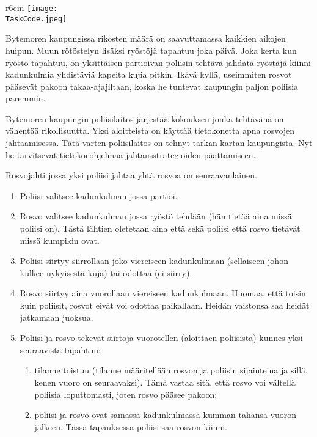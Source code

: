 \documentclass{boi2014-fi}
\renewcommand{\TaskCode}{coprobber}
\begin{document}
    \begin{wrapfigure}[8]{r}{6cm}
        \vspace{-24pt}
		\texttt{[image: \\TaskCode.jpeg]}
	\end{wrapfigure}
    
    Bytemoren kaupungissa rikosten määrä on saavuttamassa kaikkien aikojen
    huipun. Muun rötöstelyn lisäksi ryöstöjä tapahtuu joka päivä.
    Joka kerta kun ryöstö tapahtuu, on yksittäisen partioivan poliisin
    tehtävä jahdata ryöstäjä kiinni kadunkulmia yhdistäviä kapeita kujia
    pitkin. Ikävä kyllä, useimmiten rosvot pääsevät pakoon takaa-ajajiltaan,
    koska he tuntevat kaupungin paljon poliisia paremmin.

    Bytemoren kaupungin poliisilaitos järjestää kokouksen jonka tehtävänä
    on vähentää rikollisuutta. Yksi aloitteista on käyttää tietokonetta
    apna rosvojen jahtaamisessa. Tätä varten poliisilaitos on tehnyt tarkan
    kartan kaupungista. Nyt he tarvitsevat tietokoeohjelmaa
    jahtausstrategioiden päättämiseen.
    
    Rosvojahti jossa yksi poliisi jahtaa yhtä rosvoa on seuraavanlainen.
    \begin{enumerate}
        \item Poliisi valitsee kadunkulman jossa partioi.
        \item Rosvo valitsee kadunkulman jossa ryöstö tehdään (hän tietää
            aina missä poliisi on). Tästä lähtien oletetaan aina että sekä
            poliisi että rosvo tietävät missä kumpikin ovat.
        \item Poliisi siirtyy siirrollaan joko viereiseen kadunkulmaan
            (sellaiseen johon kulkee nykyisestä kuja) tai odottaa (ei siirry).
        \item Rosvo siirtyy aina vuorollaan viereiseen kadunkulmaan. Huomaa,
            että toisin kuin poliisit, rosvot eivät voi odottaa paikallaan.
            Heidän vaistonsa saa heidät jatkamaan juoksua.
        \item Poliisi ja rosvo tekevät siirtoja vuorotellen (aloittaen poliisista)
            kunnes yksi seuraavista tapahtuu:
        \begin{enumerate}
            \item tilanne toistuu (tilanne määritellään rosvon ja poliisin
                sijainteina ja sillä, kenen vuoro on seuraavaksi). Tämä vastaa
                sitä, että rosvo voi vältellä poliisia loputtomasti, joten
                rosvo pääsee pakoon;
            \item poliisi ja rosvo ovat samassa kadunkulmassa kumman tahansa
                vuoron jälkeen. Tässä tapauksessa poliisi saa rosvon kiinni.
        \end{enumerate}
    \end{enumerate}
\end{document}
